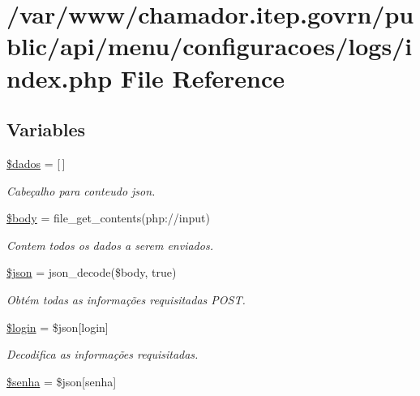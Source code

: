 \hypertarget{menu_2configuracoes_2logs_2index_8php}{}\section{/var/www/chamador.itep.\+govrn/public/api/menu/configuracoes/logs/index.php File Reference}
\label{menu_2configuracoes_2logs_2index_8php}
\subsection*{Variables}
\begin{DoxyCompactItemize}
\item 
\hyperlink{menu_2configuracoes_2logs_2index_8php_a252370d95039a38fa11afab784725d58}{\$dados} = \mbox{[}$\,$\mbox{]}
\begin{DoxyCompactList}\small\item\em Cabeçalho para conteudo json. \end{DoxyCompactList}\item 
\hyperlink{menu_2configuracoes_2logs_2index_8php_a26b9f9373f7bb79dfcf8a86dff086b45}{\$body} = file\+\_\+get\+\_\+contents(\textquotesingle{}php\+://input\textquotesingle{})
\begin{DoxyCompactList}\small\item\em Contem todos os dados a serem enviados. \end{DoxyCompactList}\item 
\hyperlink{menu_2configuracoes_2logs_2index_8php_acedd13b51401130848ce18f4d5c52605}{\$json} = json\+\_\+decode(\$body, true)
\begin{DoxyCompactList}\small\item\em Obtém todas as informações requisitadas P\+O\+ST. \end{DoxyCompactList}\item 
\hyperlink{menu_2configuracoes_2logs_2index_8php_afc31993e855f9631572adfedcfe6f34b}{\$login} = \$json\mbox{[}\textquotesingle{}login\textquotesingle{}\mbox{]}
\begin{DoxyCompactList}\small\item\em Decodifica as informações requisitadas. \end{DoxyCompactList}\item 
\hyperlink{menu_2configuracoes_2logs_2index_8php_a3678c8769c9698fd30581c1016c5f475}{\$senha} = \$json\mbox{[}\textquotesingle{}senha\textquotesingle{}\mbox{]}

\end{DoxyCompactItemize}

